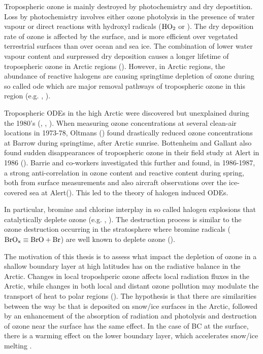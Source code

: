 \medskip

Tropospheric ozone is mainly destroyed by photochemistry and dry depostition. Loss by photochemistry involves either ozone photolysis in the presence of water vapour or direct reactions with hydroxyl radicals ($\mathrm{HO_2}$ or ). The dry deposition rate of ozone is affected by the surface, and is more efficient over vegetated terrestrial surfaces than over ocean and sea ice. The combination of lower water vapour content and surpressed dry deposition causes a longer lifetime of tropospheric ozone in Arctic regions (\cite{AMAP2015}). However, in Arctic regions, the abundance of reactive halogens are causing springtime depletion of ozone during so called \acrfull{ode}  which are major removal pathways of tropospheric ozone in this region (e.g. \cite{Simpson2015}, \cite{AMAP2015}).

\medskip

Tropospheric ODEs in the high Arctic were discovered but unexplained during the 1980's (\cite{Oltmans1981}, \cite{oltmans1986surface}, \cite{bottenheim1986measurements}). When measuring ozone concentrations at several clean-air locations in 1973-78, Oltmans (\cite{Oltmans1981}) found drastically reduced ozone concentrations at Barrow during springtime, after Arctic sunrise. Bottenheim and Gallant also found sudden disappearances of tropospheric ozone in their field study at Alert in 1986 (\cite{bottenheim1986measurements}). Barrie and co-workers investigated this further and found, in 1986-1987, a strong anti-correlation in ozone content and reactive  content during spring, both from surface measurements and also aircraft observations over the ice-covered sea at Alert(\cite{barrie}). This led to the theory of halogen induced ODEs. 

\medskip

In particular, bromine and chlorine interplay in so called halogen explosions that catalytically deplete ozone (e.g. \cite{CAO}, \cite{Simpson2015}). The destruction process is similar to the ozone destruction occurring in the stratosphere where bromine radicals ($\mathrm{BrO_x} \equiv \mathrm{BrO} + \mathrm{Br}$) are well known to deplete ozone (\cite{Parella}).   

\medskip

The motivation of this thesis is to assess what impact the depletion of ozone in a shallow boundary layer at high latitudes has on the radiative balance in the Arctic. Changes in local troposhperic ozone affects local radiation fluxes in the Arctic, while changes in both local and distant ozone pollution may modulate the transport of heat to polar regions (\cite{Shindell2007}). The hypothesis is that there are similarities between the way \acrfull{bc} that is deposited on snow/ice surfaces in the Arctic, followed by an enhancement of the absorption of radiation and photolysis and destruction of ozone near the surface has the same effect. In the case of BC at the surface, there is a warming effect on the lower boundary layer, which accelerates snow/ice melting \cite{AMAP2015}. 


